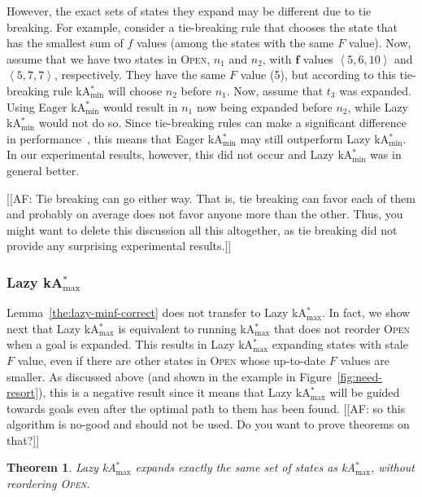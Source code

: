 \documentclass[twoside,11pt]{article}
\newtheorem{theorem}{Theorem}
\newcommand{\kastarvar}[1]{\textup{kA}$^*_{#1}$\xspace}
\newcommand{\kastarmin}{\kastarvar{\min}}
\newcommand{\kastarmax}{\kastarvar{\max}}
\newcommand{\tuple}[1]{\ensuremath{\left \langle #1 \right \rangle }}
\newcommand{\open}{\textsc{Open}\xspace}
\newcommand{\roni}[1]{\textbf{[RS:#1]}}
\begin{document}
However, the exact sets of states they expand may be different due to tie breaking.
For example, consider a tie-breaking rule that chooses the state that has the smallest sum of $f$ values (among the states with the same $F$ value).
Now, assume that we have two states in \open, $n_1$ and $n_2$, with $\mathbf{f}$ values $\tuple{5, 6, 10 }$ and $\tuple{5, 7, 7}$, respectively.
They have the same $F$ value (5), but according to this tie-breaking rule \kastarmin will choose $n_2$ before $n_1$.
Now, assume that $t_3$ was expanded.
Using Eager \kastarmin would result in $n_1$ now being expanded before $n_2$, while Lazy \kastarmin would not do so.
Since tie-breaking rules can make a significant difference in performance~\cite{asai2017tieBreaking}, this means that Eager \kastarmin may still outperform Lazy \kastarmin.
In our experimental results, however, this did not occur and Lazy \kastarmin was in general better. %

[[AF: Tie breaking can go either way. That is, tie breaking can favor each of them and probably on average does not favor anyone more than the other. Thus, you might want to delete this discussion all this altogether, as tie breaking did not provide any surprising experimental results.]]
\subsubsection{Lazy \kastarmax}

Lemma~\ref{the:lazy-minf-correct} does not transfer to Lazy \kastarmax.
In fact, we show next that Lazy \kastarmax is equivalent to running \kastarmax that does not reorder \open when a goal is expanded.
This results in Lazy \kastarmax expanding states with stale $F$ value, even if there are other states in \open whose up-to-date $F$ values are smaller.
As discussed above (and shown in the example in Figure~\ref{fig:need-resort}), this is a negative result since it means that Lazy \kastarmax will be guided towards goals even after the optimal path to them has been found. [[AF: so this algorithm is no-good and should not be used. Do you want to prove theorems on that?]]
\begin{theorem}%
  Lazy \kastarmax expands exactly the same set of states as \kastarmax, without reordering \open.
  \label{the:lazy-maxf-bad}
\end{theorem}
\end{document}
